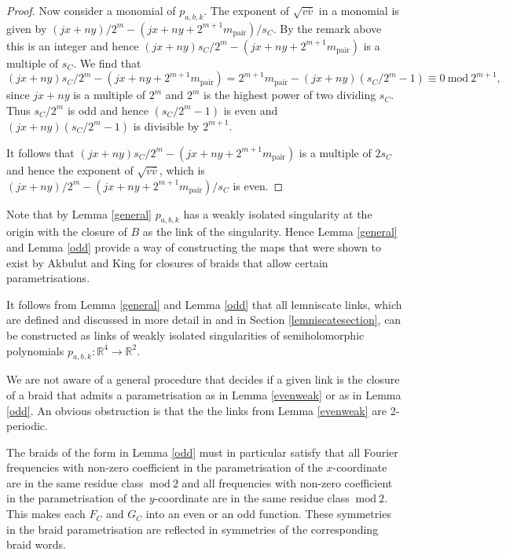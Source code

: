 \documentclass[notitlepage,12pt]{revtex4-1}
\begin{document}
\begin{proof}
Now consider a monomial of $p_{a,b,k}$. The exponent of $\sqrt{v\overline{v}}$ in a monomial is given by $(jx+ny)/2^m-(jx+ny+2^{m+1}m_{\mathrm{pair}})/s_{C}$. By the remark above this is an integer and hence $(jx+ny)s_{C}/2^m-(jx+ny+2^{m+1}m_{\mathrm{pair}})$ is a multiple of $s_{C}$. We find that
\begin{equation}
 (jx+ny)s_{C}/2^m-(jx+ny+2^{m+1}m_{\mathrm{pair}})=2^{m+1}m_{\mathrm{pair}}-(jx+ny)(s_{C}/2^m-1)\equiv 0\ \mathrm{mod}\  2^{m+1},
\end{equation}
since $jx+ny$ is a multiple of $2^m$ and $2^m$ is the highest power of two dividing $s_{C}$. Thus $s_{C}/2^m$ is odd and hence $(s_{C}/2^m-1)$ is even and $(jx+ny)(s_{C}/2^m-1)$ is divisible by $2^{m+1}$.

It follows that $(jx+ny)s_{C}/2^m-(jx+ny+2^{m+1}m_{\mathrm{pair}})$ is a multiple of $2s_{C}$ and hence the exponent of $\sqrt{v\overline{v}}$, which is $(jx+ny)/2^m-(jx+ny+2^{m+1}m_{\mathrm{pair}})/s_{C}$ is even.
\end{proof}

Note that by Lemma \ref{general} $p_{a,b,k}$ has a weakly isolated singularity at the origin with the closure of $B$ as the link of the singularity. Hence Lemma \ref{general} and Lemma \ref{odd} provide a way of constructing the maps that were shown to exist by Akbulut and King for closures of braids that allow certain parametrisations.

It follows from Lemma \ref{general} and Lemma \ref{odd} that all lemniscate links, which are defined and discussed in more detail in \cite{bode:2016lemniscate} and in Section \ref{lemniscatesection}, can be constructed as links of weakly isolated singularities of semiholomorphic polynomials $p_{a,b,k}:\mathbb{R}^4\to\mathbb{R}^2$. 

We are not aware of a general procedure that decides if a given link is the closure of a braid that admits a parametrisation as in Lemma \ref{evenweak} or as in Lemma \ref{odd}. An obvious obstruction is that the the links from Lemma \ref{evenweak} are 2-periodic.

The braids of the form in Lemma \ref{odd} must in particular satisfy that all Fourier frequencies with non-zero coefficient in the parametrisation of the $x$-coordinate are in the same residue class $\ \mathrm{mod}\  2$ and all frequencies with non-zero coefficient in the parametrisation of the $y$-coordinate are in the same residue class $\ \mathrm{mod}\  2$. This makes each $F_{C}$ and $G_{C}$ into an even or an odd function. These symmetries in the braid parametrisation are reflected in symmetries of the corresponding braid words.
\end{document}
